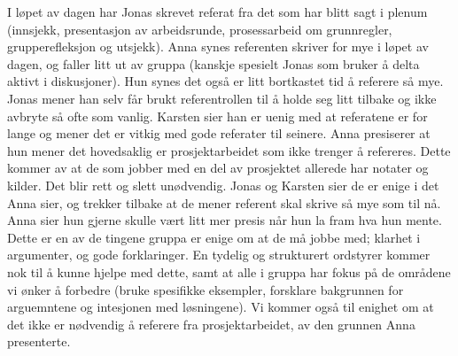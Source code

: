 \documentclass[5p]{elsarticle}
\begin{document}
I løpet av dagen har Jonas skrevet referat fra det som har blitt sagt i plenum (innsjekk, presentasjon av arbeidsrunde, prosessarbeid om grunnregler, grupperefleksjon og utsjekk). Anna synes referenten skriver for mye i løpet av dagen, og faller litt ut av gruppa (kanskje spesielt Jonas som bruker å delta aktivt i diskusjoner). Hun synes det også er litt bortkastet tid å referere så mye. Jonas mener han selv får brukt referentrollen til å holde seg litt tilbake og ikke avbryte så ofte som vanlig. Karsten sier han er uenig med at referatene er for lange og mener det er vitkig med gode referater til seinere. Anna presiserer at hun mener det hovedsaklig er prosjektarbeidet som ikke trenger å refereres. Dette kommer av at de som jobber med en del av prosjektet allerede har notater og kilder. Det blir rett og slett unødvendig. Jonas og Karsten sier de er enige i det Anna sier, og trekker tilbake at de mener referent skal skrive så mye som til nå. Anna sier hun gjerne skulle vært litt mer presis når hun la fram hva hun mente. Dette er en av de tingene gruppa er enige om at de må jobbe med; klarhet i argumenter, og gode forklaringer. En tydelig og strukturert ordstyrer kommer nok til å kunne hjelpe med dette, samt at alle i gruppa har fokus på de områdene vi ønker å forbedre (bruke spesifikke eksempler, forsklare bakgrunnen for arguemntene og intesjonen med løsningene). Vi kommer også til enighet om at det ikke er nødvendig å referere fra prosjektarbeidet, av den grunnen Anna presenterte.
\end{document}
